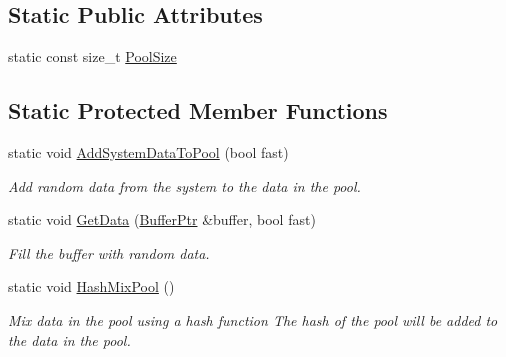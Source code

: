 \subsection*{Static Public Attributes}
\begin{DoxyCompactItemize}
\item 
static const size\+\_\+t \hyperlink{class_gost_crypt_1_1_core_1_1_random_generator_a3bfda552ccfe4434913035282dab50cc}{Pool\+Size}
\end{DoxyCompactItemize}
\subsection*{Static Protected Member Functions}
\begin{DoxyCompactItemize}
\item 
static void \hyperlink{class_gost_crypt_1_1_core_1_1_random_generator_a224d4fbb985a936d542592764722336f}{Add\+System\+Data\+To\+Pool} (bool fast)
\begin{DoxyCompactList}\small\item\em Add random data from the system to the data in the pool. \end{DoxyCompactList}\item 
static void \hyperlink{class_gost_crypt_1_1_core_1_1_random_generator_aabdea2fe9f1a142868792fc87c578e2a}{Get\+Data} (\hyperlink{class_gost_crypt_1_1_buffer_ptr}{Buffer\+Ptr} \&buffer, bool fast)
\begin{DoxyCompactList}\small\item\em Fill the buffer with random data. \end{DoxyCompactList}\item 
static void \hyperlink{class_gost_crypt_1_1_core_1_1_random_generator_a37750da5834d98eaed0a4f14a796716a}{Hash\+Mix\+Pool} ()
\begin{DoxyCompactList}\small\item\em Mix data in the pool using a hash function The hash of the pool will be added to the data in the pool. \end{DoxyCompactList}\end{DoxyCompactItemize}
